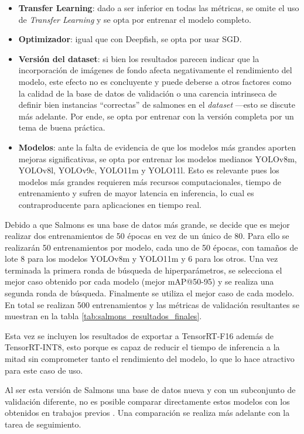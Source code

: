 \begin{itemize}
    \item \textbf{Transfer Learning}: dado a ser inferior en todas las métricas, se omite el uso de \textit{Transfer Learning} y se opta por entrenar el modelo completo.
    \item \textbf{Optimizador}: igual que con Deepfish, se opta por usar SGD.
    \item \textbf{Versión del dataset}: si bien los resultados parecen indicar que la incorporación de imágenes de fondo afecta negativamente el rendimiento del modelo, este efecto no es concluyente y puede deberse a otros factores como la calidad de la base de datos de validación o una carencia intrinseca de definir bien instancias ``correctas'' de salmones en el \textit{dataset} ---esto se discute más adelante. Por ende, se opta por entrenar con la versión completa por un tema de buena práctica.
    \item \textbf{Modelos}: ante la falta de evidencia de que los modelos más grandes aporten mejoras significativas, se opta por entrenar los modelos medianos YOLOv8m, YOLOv8l, YOLOv9c, YOLO11m y YOLO11l. Esto es relevante pues los modelos más grandes requieren más recursos computacionales, tiempo de entrenamiento y sufren de mayor latencia en inferencia, lo cual es contraproducente para aplicaciones en tiempo real.
\end{itemize}

Debido a que Salmons es una base de datos más grande, se decide que es mejor realizar dos entrenamientos de 50 épocas en vez de un único de 80. Para ello se realizarán 50 entrenamientos por modelo, cada uno de 50 épocas, con tamaños de lote 8 para los modelos YOLOv8m y YOLO11m y 6 para los otros. Una vez terminada la primera ronda de búsqueda de hiperparámetros, se selecciona el mejor caso obtenido por cada modelo (mejor mAP@50-95) y se realiza una segunda ronda de búsqueda. Finalmente se utiliza el mejor caso de cada modelo. En total se realizan 500 entrenamientos y las métricas de validación resultantes se muestran en la tabla \ref{tab:salmons_resultados_finales}.

Esta vez se incluyen los resultados de exportar a TensorRT-F16 además de TensorRT-INT8, esto porque es capaz de reducir el tiempo de inferencia a la mitad sin comprometer tanto el rendimiento del modelo, lo que lo hace atractivo para este caso de uso.


Al ser esta versión de Salmons una base de datos nueva y con un subconjunto de validación diferente, no es posible comparar directamente estos modelos con los obtenidos en trabajos previos \cite{Guerrero2024}. Una comparación se realiza más adelante con la tarea de seguimiento.

